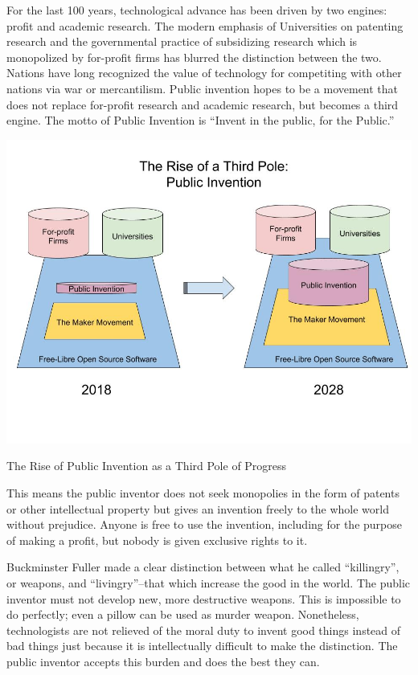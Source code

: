 \documentclass[
	fontsize=10pt, %
	twoside=false, %
	secnumdepth=1, %
]{kaobook}
\begin{document}
For the last 100 years, technological advance has been driven
by two engines: profit and academic research.
The modern emphasis of Universities on patenting research
and the governmental practice of subsidizing research which
is monopolized by for-profit firms has blurred the distinction between the two.
Nations have long recognized the value of technology for
competiting with other nations via
war or mercantilism. Public invention hopes to be a movement
that does not replace for-profit research and academic research,
but becomes a third engine. The motto of Public Invention
is ``Invent in the public, for the Public.''

\begin{marginfigure}[-5.5cm]
    \includegraphics{figures/The_Rise_of_Public_Invention.jpg}
  \caption{The Rise of Public Invention as a Third Pole of Progress}
\end{marginfigure}

This means the public inventor does not seek monopolies in
the form of patents or other intellectual property but
gives an invention freely to the whole world without prejudice.
Anyone is free to use the invention, including for the purpose
of making a profit, but nobody is given
exclusive rights to it.

Buckminster Fuller made a clear distinction between what he
called ``killingry'', or weapons, and ``livingry''--that
which increase the good in the world.
The public inventor
must not develop new, more destructive weapons.
This is impossible
to do perfectly;
even a pillow can be used as murder weapon.
Nonetheless,
technologists are not relieved of the moral duty to invent
good things instead of bad things just because it is
intellectually difficult to make the distinction.
The public inventor accepts this burden and does the best they can.
\end{document}
